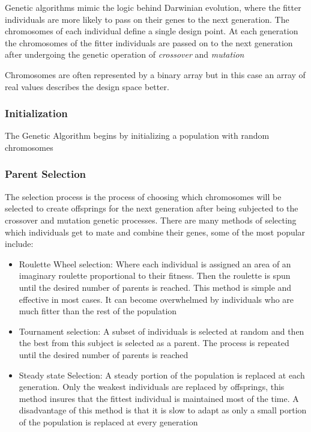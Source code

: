 Genetic algorithms mimic the logic behind Darwinian evolution, where the
fitter individuals are more likely to pass on their genes to the next
generation. The chromosomes of each individual define a single design
point. At each generation the chromosomes of the fitter individuals are
passed on to the next generation after undergoing the genetic operation
of \emph{crossover} and \emph{mutation}

Chromosomes are often represented by a binary array but in this case an
array of real values describes the design space better.

\subsubsection{Initialization}

The Genetic Algorithm begins by initializing a population with random
chromosomes

\subsubsection{Parent Selection}

The selection process is the process of choosing which chromosomes will
be selected to create offsprings for the next generation after being
subjected to the crossover and mutation genetic processes. There are
many methods of selecting which individuals get to mate and combine
their genes, some of the most popular include:

\begin{itemize}
\item
  Roulette Wheel selection: Where each individual is assigned an area of
  an imaginary roulette proportional to their fitness. Then the roulette
  is spun until the desired number of parents is reached. This method is
  simple and effective in most cases. It can become overwhelmed by
  individuals who are much fitter than the rest of the population
\item
  Tournament selection: A subset of individuals is selected at random
  and then the best from this subject is selected as a parent. The
  process is repeated until the desired number of parents is reached
\item
  Steady state Selection: A steady portion of the population is replaced
  at each generation. Only the weakest individuals are replaced by
  offsprings, this method insures that the fittest individual is
  maintained most of the time. A disadvantage of this method is that it
  is slow to adapt as only a small portion of the population is replaced
  at every generation
\end{itemize}

